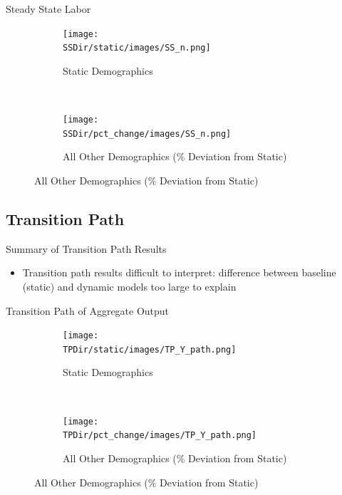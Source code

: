 \documentclass[12pt]{beamer}
\newcommand*{\SSDir}{../code/Rick/OUTPUT/SS}
\newcommand*{\TPDir}{../code/Rick/OUTPUT/TP}
\begin{document}
\begin{frame}{Steady State Labor}

	\begin{figure}[H]
		\begin{subfigure}{0.5\textwidth}
		   \centering
		   \texttt{[image: \\SSDir/static/images/SS\_n.png]}
		   \caption{Static Demographics}
		\end{subfigure}%
		~
		\begin{subfigure}{0.5\textwidth}
		   \centering
		   \texttt{[image: \\SSDir/pct\_change/images/SS\_n.png]}
		   \caption{All Other Demographics (\% Deviation from Static)}
		\end{subfigure}
	 \end{figure}

\end{frame}

\subsection{Transition Path}

\begin{frame}{Summary of Transition Path Results}
	\begin{itemize}
		\item Transition path results difficult to interpret: difference between baseline (static) and dynamic models too large to explain
	\end{itemize}
\end{frame}

\begin{frame}{Transition Path of Aggregate Output}
	\begin{figure}[H]
		\begin{subfigure}{0.5\textwidth}
		   \centering
		   \texttt{[image: \\TPDir/static/images/TP\_Y\_path.png]}
		   \caption{Static Demographics}
		\end{subfigure}%
		~
		\begin{subfigure}{0.5\textwidth}
		   \centering
		   \texttt{[image: \\TPDir/pct\_change/images/TP\_Y\_path.png]}
		   \caption{All Other Demographics (\% Deviation from Static)}
		\end{subfigure}
	 \end{figure}
\end{frame}
\end{document}
